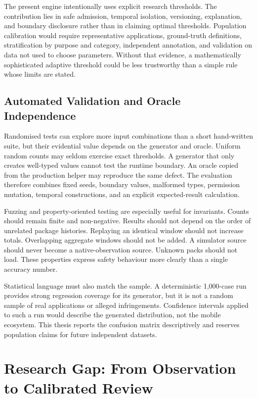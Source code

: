 The present engine intentionally uses explicit research thresholds. The contribution lies in safe admission, temporal isolation, versioning, explanation, and boundary disclosure rather than in claiming optimal thresholds. Population calibration would require representative applications, ground-truth definitions, stratification by purpose and category, independent annotation, and validation on data not used to choose parameters. Without that evidence, a mathematically sophisticated adaptive threshold could be less trustworthy than a simple rule whose limits are stated.

\subsection{Automated Validation and Oracle Independence}

Randomised tests can explore more input combinations than a short hand-written suite, but their evidential value depends on the generator and oracle. Uniform random counts may seldom exercise exact thresholds. A generator that only creates well-typed values cannot test the runtime boundary. An oracle copied from the production helper may reproduce the same defect. The evaluation therefore combines fixed seeds, boundary values, malformed types, permission mutation, temporal constructions, and an explicit expected-result calculation.

Fuzzing and property-oriented testing are especially useful for invariants. Counts should remain finite and non-negative. Results should not depend on the order of unrelated package histories. Replaying an identical window should not increase totals. Overlapping aggregate windows should not be added. A simulator source should never become a native-observation source. Unknown packs should not load. These properties express safety behaviour more clearly than a single accuracy number.

Statistical language must also match the sample. A deterministic 1,000-case run provides strong regression coverage for its generator, but it is not a random sample of real applications or alleged infringements. Confidence intervals applied to such a run would describe the generated distribution, not the mobile ecosystem. This thesis reports the confusion matrix descriptively and reserves population claims for future independent datasets.

\section{Research Gap: From Observation to Calibrated Review}

